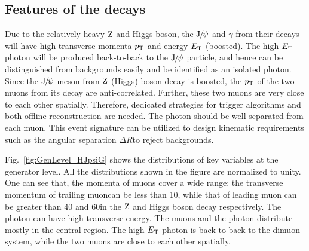 \subsection{Features of the decays}
Due to the relatively heavy $\mathrm{Z}$ and Higgs boson, the ${\mathrm{J}\hspace{-.08em}/\hspace{-.14em}\psi}$ and $\gamma$ from their decays will have high transverse momenta $p_{\mathrm{T}}$ and energy $E_{\mathrm{T}}$ (boosted). The high-$E_{\mathrm{T}}$ photon will be produced back-to-back to the ${\mathrm{J}\hspace{-.08em}/\hspace{-.14em}\psi}$ particle, and hence can be distinguished from backgrounds easily and be identified as an isolated photon. 
Since the ${\mathrm{J}\hspace{-.08em}/\hspace{-.14em}\psi}$ meson from $\mathrm{Z}$ (Higgs) boson decay is boosted, the $p_{\mathrm{T}}$ of the two muons from its decay are anti-correlated. Further, these two muons are very close to each other spatially. Therefore, dedicated strategies for trigger algorithms and both offline reconstruction are needed. 
The photon should be well separated from each muon. This event signature can be utilized to design kinematic requirements such as the angular separation $\Delta R$\footnotemark to reject backgrounds. 


Fig.~\ref{fig:GenLevel_HJpsiG} shows the distributions of key variables at the generator level. All the distributions shown in the figure are normalized to unity. One can see that, the momenta of muons cover a wide range: the transverse momentum \pt of trailing muon\footnotemark can be less than 10\GeV, while that of leading muon can be greater than 40 and 60\GeV in the $\mathrm{Z}$ and Higgs boson decay respectively. The photon can have high transverse energy. The muons and the photon distribute mostly in the central region. The high-$E_{\mathrm{T}}$ photon is back-to-back to the dimuon system, while the two muons are close to each other spatially. 

